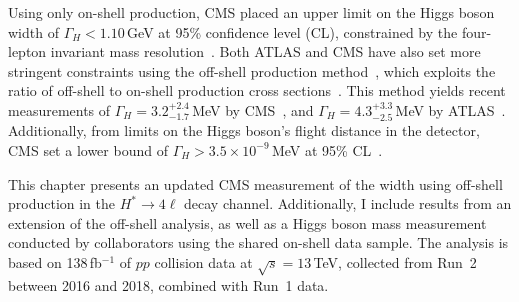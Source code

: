 Using only on-shell production, CMS placed an upper limit on the Higgs boson width of $\Gamma_H < 1.10$\,GeV at 95\% confidence level (CL), constrained by the four-lepton invariant mass resolution~\cite{Khachatryan:2014jba, Sirunyan:2017exp}. Both ATLAS and CMS have also set more stringent constraints using the off-shell production method~\cite{Khachatryan:2014iha, Aad:2015xua, Khachatryan:2015mma, Khachatryan:2016ctc, Aaboud:2018puo, Sirunyan:2019twz, CMS:2022ley}, which exploits the ratio of off-shell to on-shell production cross sections~\cite{Caola:2013yja, Kauer:2012hd, Campbell:2013una}. This method yields recent measurements of $\Gamma_H = 3.2^{+2.4}_{-1.7}$\,MeV by CMS~\cite{CMS:2022ley}, and $\Gamma_H = 4.3^{+3.3}_{-2.5}$\,MeV by ATLAS~\cite{atlascollaboration2023evidence}. Additionally, from limits on the Higgs boson's flight distance in the detector, CMS set a lower bound of $\Gamma_H > 3.5 \times 10^{-9}$\,MeV at 95\% CL~\cite{Khachatryan:2015mma}.

This chapter presents an updated CMS measurement of the \Hboson width using off-shell production in the $H^* \to 4\ell$ decay channel. Additionally, I include results from an extension of the off-shell analysis, as well as a Higgs boson mass measurement conducted by collaborators using the shared on-shell data sample. The analysis is based on 138\,fb$^{-1}$ of $pp$ collision data at $\sqrt{s} = 13$\,TeV, collected from Run~2 between 2016 and 2018, combined with Run~1 data.








